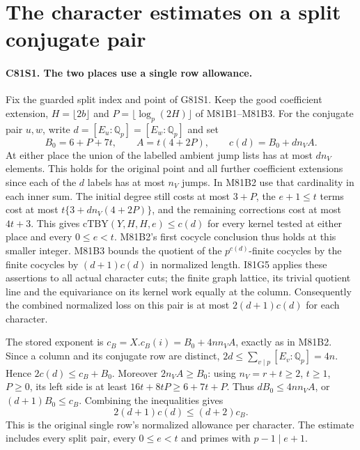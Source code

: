 \section{The character estimates on a split conjugate pair}

\paragraph{C81S1. The two places use a single row allowance.}
Fix the guarded split index and point of G81S1. Keep the good
coefficient extension, $H=\lfloor2b\rfloor$ and
$P=\lfloor\log_p(2H)\rfloor$ of M81B1--M81B3. For the conjugate
pair $u,w$, write $d=[E_u:\mathbb Q_p]=[E_w:\mathbb Q_p]$ and set
\[
 B_0=6+P+7t,\qquad A=t(4+2P),\qquad c(d)=B_0+d n_V A.
\]
At either place the union of the labelled ambient jump lists has
at most $d n_V$ elements. This holds for the original point and
all further coefficient extensions since each of the $d$ labels
has at most $n_V$ jumps. In M81B2 use that cardinality in each
inner sum. The initial degree still costs at most $3+P$, the
$e+1\le t$ terms cost at most $t\{3+d n_V(4+2P)\}$, and the
remaining corrections cost at most $4t+3$. This gives
$\mathrm{cTBY}(Y,H,H,e)\le c(d)$ for every kernel tested at
either place and every $0\le e<t$. M81B2's first cocycle
conclusion thus holds at this smaller integer. M81B3 bounds the
quotient of the $p^{c(d)}$-finite cocycles by the finite
cocycles by $(d+1)c(d)$ in normalized length. I81G5 applies
these assertions to all actual character cuts; the finite graph
lattice, its trivial quotient line and the equivariance on its
kernel work equally at the column. Consequently the combined
normalized loss on this pair is at most $2(d+1)c(d)$ for each
character.

The stored exponent is $c_B=X.c_B(i)=B_0+4n n_V A$, exactly as
in M81B2. Since a column and its conjugate row are distinct,
$2d\le\sum_{v\mid p}[E_v:\mathbb Q_p]=4n$. Hence
$2c(d)\le c_B+B_0$. Moreover $2n_V A\ge B_0$: using
$n_V=r+t\ge2$, $t\ge1$, $P\ge0$, its left side is at least
$16t+8tP\ge6+7t+P$. Thus $dB_0\le4n n_V A$, or
$(d+1)B_0\le c_B$. Combining the inequalities gives
\[
                2(d+1)c(d)\le (d+2)c_B.
\]
This is the original single row's normalized allowance per
character. The estimate includes every split pair, every
$0\le e<t$ and primes with $p-1\mid e+1$.

